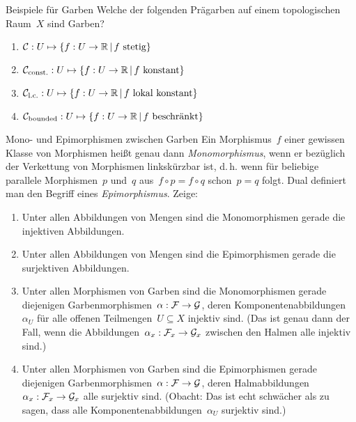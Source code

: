 \documentclass{uebblatt}
\begin{document}

\begin{aufgabe}{Beispiele für Garben}
Welche der folgenden Prägarben auf einem topologischen Raum~$X$ sind Garben?
\begin{enumerate}
\item $\mathcal{C} : U \mapsto \{ f : U \to \mathbb{R} \,|\, \text{$f$ stetig} \}$
\item $\mathcal{C}_\text{const.} : U \mapsto \{ f : U \to \mathbb{R} \,|\, \text{$f$ konstant} \}$
\item $\mathcal{C}_\text{l.c.} : U \mapsto \{ f : U \to \mathbb{R} \,|\, \text{$f$ lokal konstant} \}$
\item $\mathcal{C}_\text{bounded} : U \mapsto \{ f : U \to \mathbb{R} \,|\, \text{$f$ beschränkt} \}$
\end{enumerate}
\end{aufgabe}

\begin{aufgabe}{Mono- und Epimorphismen zwischen Garben}
Ein Morphismus~$f$ einer gewissen Klasse von Morphismen heißt genau dann
\emph{Monomorphismus}, wenn er bezüglich der Verkettung von Morphismen
linkskürzbar ist, d.\,h. wenn für beliebige parallele Morphismen~$p$ und~$q$
aus~$f \circ p = f \circ q$ schon~$p = q$ folgt. Dual definiert man den Begriff
eines \emph{Epimorphismus}. Zeige:
\begin{enumerate}
\item Unter allen Abbildungen von Mengen sind die Monomorphismen gerade die
injektiven Abbildungen.
\item Unter allen Abbildungen von Mengen sind die Epimorphismen gerade die
surjektiven Abbildungen.
\item Unter allen Morphismen von Garben sind die Monomorphismen gerade
diejenigen Garbenmorphismen~$\alpha : \mathcal{F} \to \mathcal{G}$, deren
Komponentenabbildungen~$\alpha_U$ für alle offenen Teilmengen~$U \subseteq X$
injektiv sind. (Das ist genau dann der Fall, wenn die Abbildungen~$\alpha_x :
\mathcal{F}_x \to \mathcal{G}_x$ zwischen den Halmen alle injektiv sind.)
\item Unter allen Morphismen von Garben sind die Epimorphismen gerade
diejenigen Garbenmorphismen~$\alpha : \mathcal{F} \to \mathcal{G}$, deren
Halmabbildungen~$\alpha_x : \mathcal{F}_x \to \mathcal{G}_x$ alle surjektiv sind. (Obacht: Das
ist echt schwächer als zu sagen, dass alle Komponentenabbildungen~$\alpha_U$
surjektiv sind.)
\end{enumerate}
\end{aufgabe}
\end{document}
